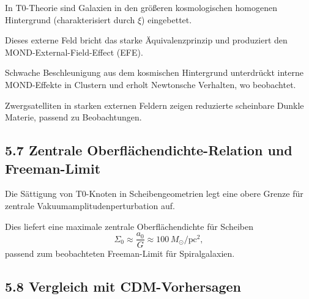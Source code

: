 \documentclass[12pt,a4paper]{article}
\begin{document}
	In T0-Theorie sind Galaxien in den größeren kosmologischen homogenen Hintergrund (charakterisiert durch $\xi$) eingebettet.
	
	Dieses externe Feld bricht das starke Äquivalenzprinzip und produziert den MOND-External-Field-Effect (EFE).
	
	Schwache Beschleunigung aus dem kosmischen Hintergrund unterdrückt interne MOND-Effekte in Clustern und erholt Newtonsche Verhalten, wo beobachtet.
	
	Zwergsatelliten in starken externen Feldern zeigen reduzierte scheinbare Dunkle Materie, passend zu Beobachtungen.
	
	\subsection{5.7 Zentrale Oberflächendichte-Relation und Freeman-Limit}
	
	Die Sättigung von T0-Knoten in Scheibengeometrien legt eine obere Grenze für zentrale Vakuumamplitudenperturbation auf.
	
	Dies liefert eine maximale zentrale Oberflächendichte für Scheiben
	\[
	\Sigma_0 \approx \frac{a_0}{G} \approx 100 \, M_\odot / \text{pc}^2,
	\]
	passend zum beobachteten Freeman-Limit für Spiralgalaxien.
	
	\subsection{5.8 Vergleich mit CDM-Vorhersagen}
	
	\begin{table}[htbp]
		\centering
		\caption{Vorhersagen auf galaktischer Skala}
		\label{tab:galaktisch}
	\end{table}
	
\end{document}
